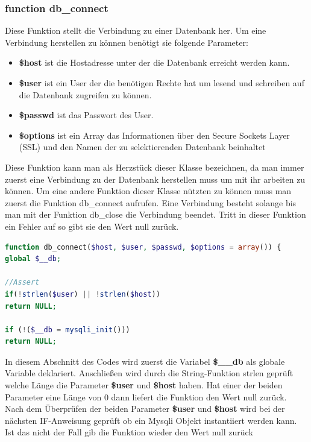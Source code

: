 \subsubsection{function db\_connect}
Diese Funktion stellt die Verbindung zu einer Datenbank her. Um eine Verbindung herstellen zu können benötigt sie folgende Parameter:
	\begin{itemize}
		\item \textbf{\$host} ist die Hostadresse unter der die Datenbank erreicht werden kann.
		\item \textbf{\$user} ist ein User der die benötigen Rechte hat um lesend und schreiben auf die Datenbank zugreifen zu können.
		\item \textbf{\$passwd} ist das Passwort des User.
		\item \textbf{\$options} ist ein Array das Informationen über den Secure Sockets Layer (SSL) und den Namen der zu selektierenden Datenbank beinhaltet
	\end{itemize}
Diese Funktion kann man als Herzstück dieser Klasse bezeichnen, da man immer zuerst eine Verbindung zu der Datenbank herstellen muss um mit ihr arbeiten zu können. Um eine andere Funktion dieser Klasse nützten zu können muss man zuerst die Funktion db\_connect aufrufen.
Eine Verbindung besteht solange bis man mit der Funktion db\_close die Verbindung beendet.
Tritt in dieser Funktion ein Fehler auf so gibt sie den Wert null zurück.
\newpage

\begin{lstlisting}[language=PHP, caption=mysqli.php/function-db\_connect1, firstnumber=21]
function db_connect($host, $user, $passwd, $options = array()) {
global $__db;

//Assert
if(!strlen($user) || !strlen($host))
return NULL;

if (!($__db = mysqli_init()))
return NULL;
\end{lstlisting}

In diesem Abschnitt des Codes wird zuerst die Variabel \textbf{\$\_\_db} als globale Variable deklariert. Anschließen wird durch die String-Funktion strlen geprüft welche Länge die Parameter \textbf{\$user} und \textbf{\$host} haben. Hat einer der beiden Parameter eine Länge von 0 dann liefert die Funktion den Wert null zurück.\\
Nach dem Überprüfen der beiden Parameter \textbf{\$user} und \textbf{\$host} wird bei der nächsten IF-Anweisung geprüft ob ein Mysqli Objekt instantiiert werden kann. Ist das nicht der Fall gib die Funktion wieder den Wert null zurück

